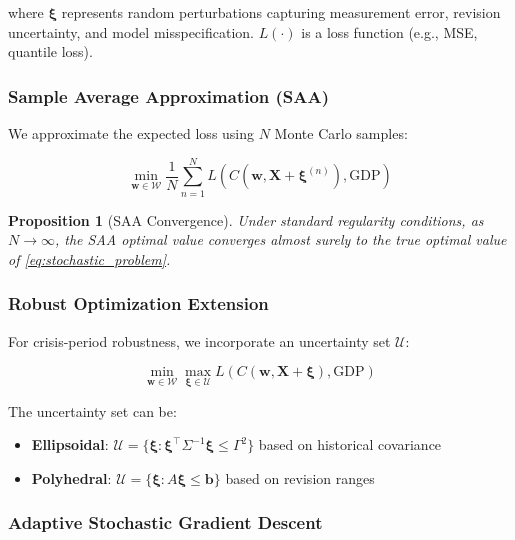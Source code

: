 \documentclass[12pt,a4paper]{article}
\newtheorem{proposition}{Proposition}
\begin{document}
where $\boldsymbol{\xi}$ represents random perturbations capturing measurement error, revision uncertainty, and model misspecification. $L(\cdot)$ is a loss function (e.g., MSE, quantile loss).

\subsubsection{Sample Average Approximation (SAA)}

We approximate the expected loss using $N$ Monte Carlo samples:

\begin{equation}
    \min_{\mathbf{w} \in \mathcal{W}} \frac{1}{N} \sum_{n=1}^{N} L\left(C(\mathbf{w}, \mathbf{X} + \boldsymbol{\xi}^{(n)}), \text{GDP}\right)
    \label{eq:saa}
\end{equation}

\begin{proposition}[SAA Convergence]
Under standard regularity conditions, as $N \to \infty$, the SAA optimal value converges almost surely to the true optimal value of \eqref{eq:stochastic_problem}.
\end{proposition}

\subsubsection{Robust Optimization Extension}

For crisis-period robustness, we incorporate an uncertainty set $\mathcal{U}$:

\begin{equation}
    \min_{\mathbf{w} \in \mathcal{W}} \max_{\boldsymbol{\xi} \in \mathcal{U}} L\left(C(\mathbf{w}, \mathbf{X} + \boldsymbol{\xi}), \text{GDP}\right)
    \label{eq:robust}
\end{equation}

The uncertainty set can be:
\begin{itemize}
    \item \textbf{Ellipsoidal}: $\mathcal{U} = \{\boldsymbol{\xi} : \boldsymbol{\xi}^\top \Sigma^{-1} \boldsymbol{\xi} \leq \Gamma^2\}$ based on historical covariance
    \item \textbf{Polyhedral}: $\mathcal{U} = \{\boldsymbol{\xi} : A\boldsymbol{\xi} \leq \mathbf{b}\}$ based on revision ranges
\end{itemize}

\subsubsection{Adaptive Stochastic Gradient Descent}
\end{document}
